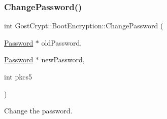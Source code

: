 \subsubsection{\texorpdfstring{Change\+Password()}{ChangePassword()}}
{\footnotesize\ttfamily int Gost\+Crypt\+::\+Boot\+Encryption\+::\+Change\+Password (\begin{DoxyParamCaption}\item[{\hyperlink{struct_password}{Password} $\ast$}]{old\+Password,  }\item[{\hyperlink{struct_password}{Password} $\ast$}]{new\+Password,  }\item[{int}]{pkcs5 }\end{DoxyParamCaption})}



Change the password. 


